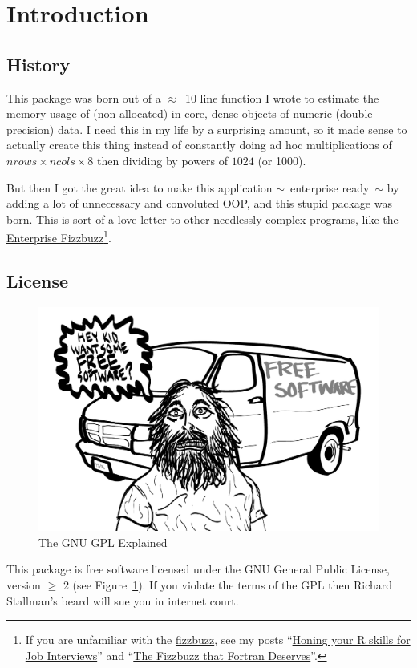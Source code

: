 \section{Introduction}

\subsection{History}

This package was born out of a $\approx$~10 line function I wrote to estimate the memory usage of (non-allocated) in-core, dense  objects of numeric (double precision) data.  I need this in my life by a surprising amount, so it made sense to actually create this thing instead of constantly doing ad hoc multiplications of $nrows\times ncols \times 8$ then dividing by powers of $1024$ (or 1000).

But then I got the great idea to make this application $\sim$~\hspace{-.1cm}enterprise ready\hspace{-.1cm}~$\sim$ by adding a lot of unnecessary and convoluted OOP, and this stupid package was born.  This is sort of a love letter to other needlessly complex programs, like the \href{https://github.com/Mikkeren/FizzBuzzEnterpriseEdition}{Enterprise Fizzbuzz}\footnote{If you are unfamiliar with the \href{https://en.wikipedia.org/wiki/Bizz_buzz}{fizzbuzz}, see my posts ``\href{http://librestats.com/2012/01/10/honing-your-r-skills-for-job-interviews/}{Honing your R skills for Job Interviews}'' and ``\href{http://librestats.com/2013/04/26/the-fizzbuzz-that-fortran-deserves/}{The Fizzbuzz that Fortran Deserves}''.}.



\subsection{License}

\begin{figure}[th]
  \centering
  \includegraphics[scale=.35]{./include/gpl.png}
  \caption{The GNU GPL Explained}
  \label{fig:gnu}
\end{figure}
This package is free software licensed under the GNU General Public License, version $\geq$ 2 (see Figure~\ref{fig:gnu}).
If you violate the terms of the GPL then Richard Stallman's beard will sue you in internet court.



